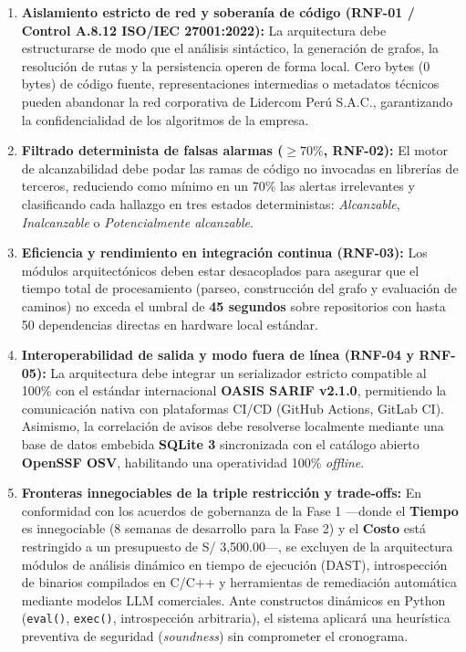 \begin{enumerate}
    \item \textbf{Aislamiento estricto de red y soberanía de código (RNF-01 / Control A.8.12 ISO/IEC 27001:2022):} 
    La arquitectura debe estructurarse de modo que el análisis sintáctico, la generación de grafos, la resolución de rutas y la persistencia operen de forma local. Cero bytes (0 bytes) de código fuente, representaciones intermedias o metadatos técnicos pueden abandonar la red corporativa de Lidercom Perú S.A.C., garantizando la confidencialidad de los algoritmos de la empresa.

    \item \textbf{Filtrado determinista de falsas alarmas ($\ge 70\%$, RNF-02):} 
    El motor de alcanzabilidad debe podar las ramas de código no invocadas en librerías de terceros, reduciendo como mínimo en un 70\% las alertas irrelevantes y clasificando cada hallazgo en tres estados deterministas: \textit{Alcanzable}, \textit{Inalcanzable} o \textit{Potencialmente alcanzable}.

    \item \textbf{Eficiencia y rendimiento en integración continua (RNF-03):} 
    Los módulos arquitectónicos deben estar desacoplados para asegurar que el tiempo total de procesamiento (parseo, construcción del grafo y evaluación de caminos) no exceda el umbral de \textbf{45 segundos} sobre repositorios con hasta 50 dependencias directas en hardware local estándar.

    \item \textbf{Interoperabilidad de salida y modo fuera de línea (RNF-04 y RNF-05):} 
    La arquitectura debe integrar un serializador estricto compatible al 100\% con el estándar internacional \textbf{OASIS SARIF v2.1.0}, permitiendo la comunicación nativa con plataformas CI/CD (GitHub Actions, GitLab CI). Asimismo, la correlación de avisos debe resolverse localmente mediante una base de datos embebida \textbf{SQLite 3} sincronizada con el catálogo abierto \textbf{OpenSSF OSV}, habilitando una operatividad 100\% \textit{offline}.

    \item \textbf{Fronteras innegociables de la triple restricción y trade-offs:} 
    En conformidad con los acuerdos de gobernanza de la Fase 1 ---donde el \textbf{Tiempo} es innegociable (8 semanas de desarrollo para la Fase 2) y el \textbf{Costo} está restringido a un presupuesto de S/ 3,500.00---, se excluyen de la arquitectura módulos de análisis dinámico en tiempo de ejecución (DAST), introspección de binarios compilados en C/C++ y herramientas de remediación automática mediante modelos LLM comerciales. Ante constructos dinámicos en Python (\texttt{eval()}, \texttt{exec()}, introspección arbitraria), el sistema aplicará una heurística preventiva de seguridad (\textit{soundness}) sin comprometer el cronograma.
\end{enumerate}

